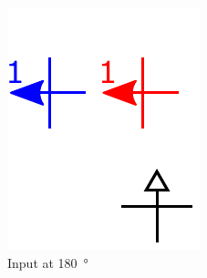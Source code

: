\documentclass[11pt,a4paper,english,twoside]{article}
\newcommand{\rulesep}{\unskip\ \vrule\ }
\begin{document}
\begin{figure}[b!]
\begin{subfigure}[t]{0.2\textwidth}
    \includegraphics[width=\textwidth]{Figures/half_adder/schematic/000006_inputs_In1_0213/Input 180 deg arrowtext.pdf}
    \caption{Input at \SI{180}{\degree}}
\end{subfigure}
\rulesep
\begin{subfigure}[t]{0.2\textwidth}

\end{subfigure}
\end{figure}
\end{document}

